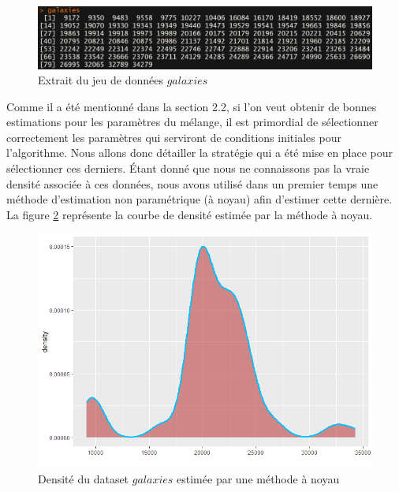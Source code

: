 \documentclass[a4paper,french,10pt]{article}
\begin{document}
\begin{figure}[htp] 
	\centering
	\includegraphics[scale=0.7]{images/dataset.png}
	\caption{Extrait du jeu de données $galaxies$}
	\label{galaxies}
\end{figure}

Comme il a été mentionné dans la section 2.2, si l'on veut obtenir de bonnes estimations pour les paramètres du mélange, il est primordial de sélectionner correctement les paramètres qui serviront de conditions initiales pour l'algorithme. Nous allons donc détailler la stratégie qui a été mise en place pour sélectionner ces derniers. Étant donné que nous ne connaissons pas la vraie densité associée à ces données, nous avons utilisé dans un premier temps une méthode d'estimation non paramétrique (à noyau) afin d'estimer cette dernière. La figure \ref{realDataDensEst} représente la courbe de densité estimée par la méthode à noyau. 

\newpage

\begin{figure}[htp] 
	\centering
	\includegraphics[scale=0.5]{images/realDataDensEst.png}
	\caption{Densité du dataset $galaxies$ estimée par une méthode à noyau}
	\label{realDataDensEst}
\end{figure}
\end{document}
